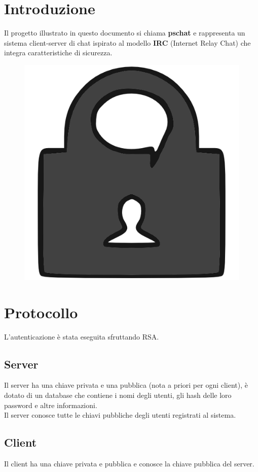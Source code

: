 \documentclass[a4paper,titlepage]{article}
\begin{document}
\section*{Introduzione}  \thispagestyle{plain}
Il progetto illustrato in questo documento si chiama \textbf{pschat} e rappresenta un sistema client-server di chat ispirato al modello \textbf{IRC} (Internet Relay Chat) che integra caratteristiche di sicurezza.\\
\begin{figure}[H]
  \centering \includegraphics[scale=1.0]{../data/psc_orig.png}
\end{figure}

\section{Protocollo}
L'autenticazione è stata eseguita sfruttando RSA.
\subsection{Server}
Il server ha una chiave privata e una pubblica (nota a priori per ogni client), è dotato di un database che contiene i nomi degli utenti, gli hash delle loro password e altre informazioni.\\
Il server conosce tutte le chiavi pubbliche degli utenti registrati al sistema.

\subsection{Client}
Il client ha una chiave privata e pubblica e conosce la chiave pubblica del server.\\
\newpage
\end{document}
